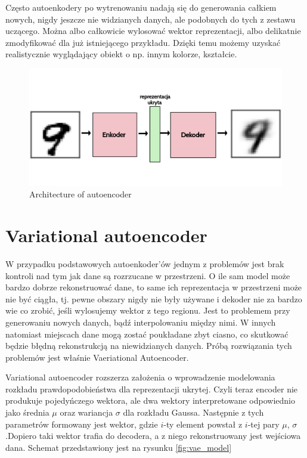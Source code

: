 Często autoenkodery po wytrenowaniu nadają się do generowania całkiem nowych, nigdy jeszcze nie widzianych danych, ale podobnych do tych z zestawu uczącego. Można albo całkowicie wylosować wektor reprezentacji, albo delikatnie zmodyfikować dla już istniejącego przykładu. Dzięki temu możemy uzyskać realistycznie wyglądający obiekt o np. innym kolorze, kształcie. 

\begin{figure}[h!]
    \centering
    \includegraphics[width=1\textwidth]{images/autoenc}
    \caption{Architecture of autoencoder}
    \label{fig:autoenc}
\end{figure}

\section{Variational autoencoder}

W przypadku podstawowych autoenkoder'ów jednym z problemów jest brak kontroli nad tym jak dane są rozrzucane w przestrzeni. O ile sam model może bardzo dobrze rekonstruować dane, to same ich reprezentacja w przestrzeni może nie być ciągła, tj. pewne obszary nigdy nie były używane i dekoder nie za bardzo wie co zrobić, jeśli wylosujemy wektor z tego regionu. Jest to problemem przy generowaniu nowych danych, bądź interpolowaniu między nimi. W innych natomiast miejscach dane mogą zostać poukładane zbyt ciasno, co skutkować będzie błędną rekonstrukcją na niewidzianych danych. Próbą rozwiązania tych problemów jest właśnie Vaeriational Autoencoder.

Variational autoencoder rozszerza założenia o wprowadzenie modelowania rozkładu prawdopodobieństwa dla reprezentacji ukrytej. Czyli teraz encoder nie produkuje pojedyńczego wektora, ale dwa wektory interpretowane odpowiednio jako średnia $\mu$ oraz wariancja $\sigma$ dla rozkładu Gaussa. Następnie z tych parametrów formowany jest wektor, gdzie $i$-ty element powstał z $i$-tej pary $\mu$, $\sigma$.Dopiero taki wektor trafia do decodera, a z niego rekonstruowany jest wejściowa dana. Schemat przedstawiony jest na rysunku \ref{fig:vae_model}

